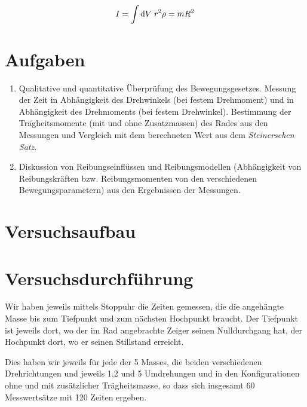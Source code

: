 \documentclass[a4paper,german,12pt,smallheadings]{scrartcl}
\begin{document}
\begin{equation}
  I = \int \dif V \; r^2 \rho = m R^2
\end{equation}

\section*{Aufgaben}
\begin{enumerate}[1.]
  \item Qualitative und quantitative Überprüfung des Bewegungsgesetzes. Messung
    der Zeit in Abhängigkeit des Drehwinkels (bei festem Drehmoment) und in
    Abhängigkeit des Drehmoments (bei festem Drehwinkel). Bestimmung der
    Trägheitsmomente (mit und ohne Zusatzmassen) des Rades aus den Messungen
    und Vergleich mit dem berechneten Wert aus dem \textit{Steinerschen Satz}.
  \item
    Diskussion von Reibungseinflüssen und Reibungsmodellen (Abhängigkeit von
    Reibungskräften bzw. Reibungsmomenten von den verschiedenen
    Bewegungsparametern) aus den Ergebnissen der Messungen.
\end{enumerate}

\newpage
\section*{Versuchsaufbau}


\section*{Versuchsdurchführung}

Wir haben jeweils mittels Stoppuhr die Zeiten gemessen, die die angehängte
Masse bis zum Tiefpunkt und zum nächsten Hochpunkt braucht. Der Tiefpunkt ist
jeweils dort, wo der im Rad angebrachte Zeiger seinen Nulldurchgang hat, der
Hochpunkt dort, wo er seinen Stillstand erreicht.

Dies haben wir jeweils für jede der 5 Masses, die beiden verschiedenen Drehrichtungen
und jeweils 1,2 und 5 Umdrehungen und in den Konfigurationen ohne und mit
zusätzlicher Trägheitsmasse, so dass sich insgesamt 60 Messwertsätze mit 120
Zeiten ergeben.
\end{document}
